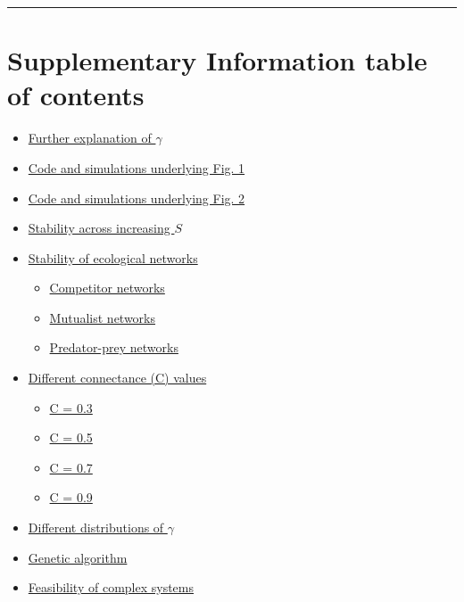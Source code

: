 \documentclass[]{article}
\providecommand{\tightlist}{%
  \setlength{\itemsep}{0pt}\setlength{\parskip}{0pt}}
\providecommand{\tightlist}{%
  \setlength{\itemsep}{0pt}\setlength{\parskip}{0pt}}
\begin{document}
\begin{center}\rule{0.5\linewidth}{\linethickness}\end{center}

\section{Supplementary Information table of
contents}\label{supplemental-information-table-of-contents}

\begin{itemize}
\tightlist
\item
  \protect\hyperlink{moregamma}{Further explanation of \(\gamma\)}
\item
  \protect\hyperlink{Fig1}{Code and simulations underlying Fig. 1}
\item
  \protect\hyperlink{Fig2}{Code and simulations underlying Fig. 2}
\item
  \protect\hyperlink{IncrS}{Stability across increasing \(S\)}
\item
  \protect\hyperlink{ecological}{Stability of ecological networks}

  \begin{itemize}
  \tightlist
  \item
    \protect\hyperlink{competition}{Competitor networks}
  \item
    \protect\hyperlink{mutualism}{Mutualist networks}
  \item
    \protect\hyperlink{pred-prey}{Predator-prey networks}
  \end{itemize}
\item
  \protect\hyperlink{connectance}{Different connectance (C) values}

  \begin{itemize}
  \tightlist
  \item
    \protect\hyperlink{connect3}{C = 0.3}
  \item
    \protect\hyperlink{connect5}{C = 0.5}
  \item
    \protect\hyperlink{connect7}{C = 0.7}
  \item
    \protect\hyperlink{connect9}{C = 0.9}
  \end{itemize}
\item
  \protect\hyperlink{gam_dist}{Different distributions of \(\gamma\)}
\item
  \protect\hyperlink{ga}{Genetic algorithm}
\item
  \protect\hyperlink{Feasibility}{Feasibility of complex systems}
\end{itemize}
\end{document}
